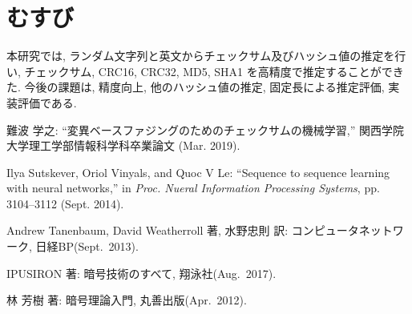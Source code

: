 \documentclass[twocolumn, a4paper]{ieicejsp}
\begin{document}


\vspace{1mm}
\section{むすび}
本研究では, ランダム文字列と英文からチェックサム及びハッシュ値の推定を行い, チェックサム, CRC16, CRC32, MD5, SHA1 を高精度で推定することができた.
今後の課題は, 精度向上, 他のハッシュ値の推定, 固定長による推定評価, 実装評価である.

\begin{footnotesize}
  \begin{thebibliography}{15}
 難波 学之:
``変異ベースファジングのためのチェックサムの機械学習,''
関西学院大学理工学部情報科学科卒業論文 (Mar. 2019).

 Ilya Sutskever, Oriol Vinyals, and Quoc V Le:
``Sequence to sequence learning with neural networks,''
in \textit{Proc. Nueral Information Processing Systems}, pp. 3104–3112 (Sept. 2014).

 Andrew Tanenbaum, David Weatherroll 著, 水野忠則 訳:
  コンピュータネットワーク,
 日経BP(Sept.\ 2013).

  IPUSIRON 著:
  暗号技術のすべて,
 翔泳社(Aug.\ 2017).

  林 芳樹 著:
  暗号理論入門,
 丸善出版(Apr.\ 2012).
  \end{thebibliography}

\end{footnotesize}
\end{document}
